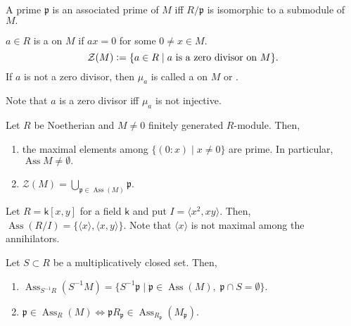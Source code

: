 \documentclass[12pt]{article}	%
\DeclareMathOperator{\Ass}{Ass}
\begin{document}
\begin{prop}
	A prime $\mathfrak{p}$ is an associated prime of $M$ iff $R/\mathfrak{p}$ is isomorphic to a submodule of $M.$
\end{prop}

\begin{defn}%
	$a \in R$ is a  on $M$ if $ax = 0$ for some $0 \neq x \in M.$
	\begin{equation*} 
		\mathcal{Z}(M) \vcentcolon= \{a \in R \mid a \text{ is a zero divisor on }M\}.
	\end{equation*} 
	If $a$ is not a zero divisor, then $\mu_a$ is called a  on $M$ or .
\end{defn}

Note that $a$ is a zero divisor iff $\mu_a$ is not injective.

\begin{prop}
	Let $R$ be Noetherian and $M \neq 0$ finitely generated $R$-module. Then,
	\begin{enumerate}
		\item the maximal elements among $\{(0 : x) \mid x \neq 0\}$ are prime. In particular, $\Ass M \neq \emptyset.$
		\item $\mathcal{Z}(M) = \bigcup_{\mathfrak{p} \in \Ass(M)}\mathfrak{p}.$
	\end{enumerate}
\end{prop}

\begin{ex}
	Let $R = \mathsf{k}[x, y]$ for a field $\mathsf{k}$ and put $I = \langle x^2, xy\rangle.$ Then, $\Ass(R/I) = \{\langle x\rangle, \langle x, y\rangle\}.$ Note that $\langle x\rangle$ is not maximal among the annihilators.
\end{ex}

\begin{prop} \label{prop:assoflocalisation}
	Let $S \subset R$ be a multiplicatively closed set. Then,
	\begin{enumerate}
		\item $\Ass_{S^{-1}R}(S^{-1}M) = \{S^{-1}\mathfrak{p} \mid \mathfrak{p} \in \Ass(M),\;\mathfrak{p} \cap S = \emptyset\}.$
		\item $\mathfrak{p} \in \Ass_R(M) \iff \mathfrak{p}R_{\mathfrak{p}} \in \Ass_{R_{\mathfrak{p}}}(M_{\mathfrak{p}}).$
	\end{enumerate}
\end{prop}
\end{document}
